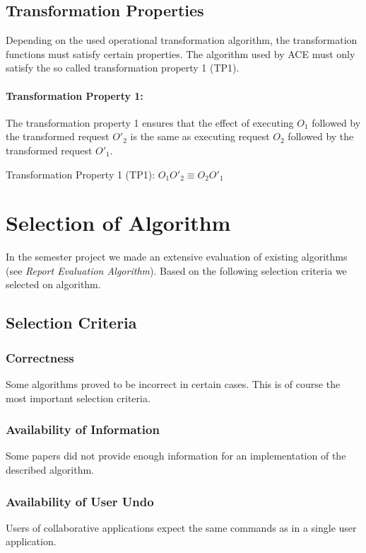 \subsection{Transformation Properties}
Depending on the used operational transformation algorithm, the transformation
functions must satisfy certain properties. The algorithm used by ACE must
only satisfy the so called transformation property 1 (TP1). 

\paragraph{Transformation Property 1:}
The transformation property 1 ensures that the effect of executing $O_1$
followed by the transformed request $O'_2$ is the same as executing
request $O_2$ followed by the transformed request $O'_1$.

\begin{defn}
Transformation Property 1 (TP1):
$ O_1 O'_2 \equiv O_2 O'_1 $
\end{defn}



\section{Selection of Algorithm}
In the semester project we made an extensive evaluation of existing algorithms
(see \emph{Report Evaluation Algorithm}). Based on the following selection
criteria we selected on algorithm.


\subsection{Selection Criteria}

\subsubsection{Correctness} 
Some algorithms proved to be incorrect in certain
cases. This is of course the most important selection criteria.

\subsubsection{Availability of Information} 
Some papers did not provide enough
information for an implementation of the described algorithm.

\subsubsection{Availability of User Undo} 
Users of collaborative applications
expect the same commands as in a single user application. 

